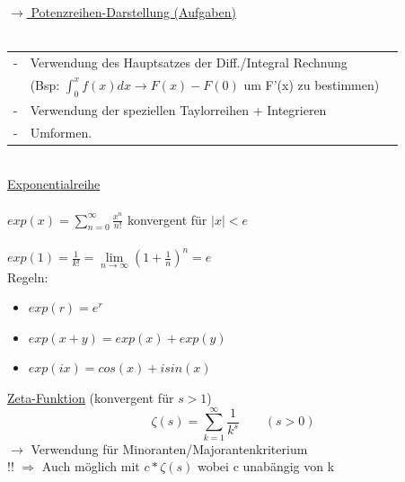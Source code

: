 \documentclass[6pt]{article}
\begin{document}
\begin{multicols*}{3}
	\underline{$\rightarrow$ Potenzreihen-Darstellung (Aufgaben) } \\ 
		\vspace{-2mm}\\
		\begin{tabular}{lll}
			- 	&  Verwendung des Hauptsatzes der Diff./Integral Rechnung\\
				& (Bsp: $\int_0^x f(x) dx \longrightarrow F(x) - F(0) $ um F'(x) zu bestimmen)\\
			- 	& Verwendung der speziellen Taylorreihen + Integrieren\\
			- 	& Umformen.\\
		\end{tabular}
		\vspace{-4mm}\\
		

	\underline{Exponentialreihe} \\ 
		\vspace{-4mm}\\
		
					$exp(x) = \sum_{n=0}^\infty \frac{x^n}{n!}$ \quad konvergent f{\"u}r $|x| < e$ \\
					\vspace{-2mm}\\
					$exp(1) = \frac{1}{k!} = \lim\limits_{n \to \infty} {\left( 1 + \frac{1}{n}\right)}^n = e$
					\vspace{2mm}\\
					Regeln:
					\vspace{-2mm} 
					\begin{itemize}[itemsep=2pt, parsep=1pt]
						\item $exp(r) = e^r$
						\item 	$exp(x+y) = exp(x) + exp(y)$
						\item $exp(ix) = cos(x) + i sin(x)$
					\end{itemize}

				
	
	\underline{Zeta-Funktion} (konvergent f{\"u}r $s>1$) \\
	\begin{equation*}
		\zeta(s) =  \sum_{k=1}^\infty \frac{1}{k^s} \qquad (s > 0)
	\end{equation*}
	$\rightarrow$ Verwendung f{\"u}r Minoranten/Majorantenkriterium \\
	!! $\Rightarrow$ Auch m{\"o}glich mit $c * \zeta(s)$ wobei c unab{\"a}ngig von k

\vspace{-4mm}

\end{multicols*}
\end{document}
